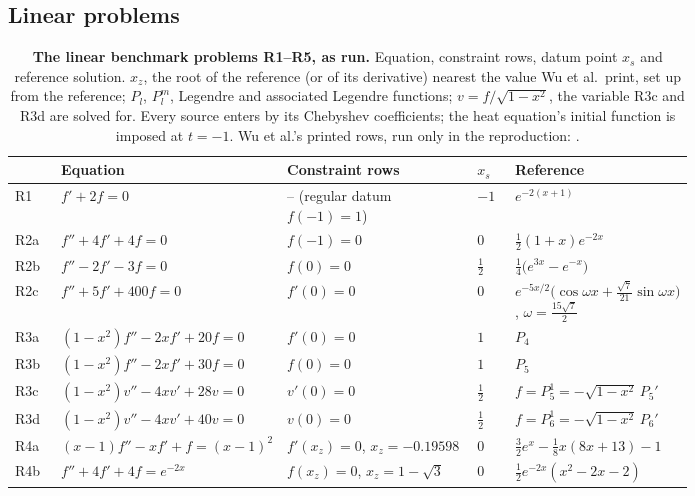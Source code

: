 \subsection{Linear problems}
\label{app:catalogue-linear}

\begin{table}[htbp]
    \centering
    \caption[The linear benchmark problems R1--R5]{\textbf{The linear benchmark problems R1--R5, as run.} Equation, constraint rows, datum point $x_s$ and reference solution. $x_z$, the root of the reference (or of its derivative) nearest the value Wu et al.\ print, set up from the reference; $P_l$, $P_l^m$, Legendre and associated Legendre functions; $v=f/\sqrt{1-x^2}$, the variable R3c and R3d are solved for. Every source enters by its Chebyshev coefficients; the heat equation's initial function is imposed at $t=-1$. Wu et al.'s printed rows, run only in the reproduction: .}
    \label{tab:catalogue-linear}
    \footnotesize
    \begin{tabular}{@{}l p{0.26\linewidth} p{0.29\linewidth} l p{0.24\linewidth}@{}}
        \toprule
        & Equation & Constraint rows & $x_s$ & Reference \\
        \midrule
        R1  & $f' + 2f = 0$ & -- (regular datum $f(-1)=1$) & $-1$ & $e^{-2(x+1)}$ \\
        R2a & $f'' + 4f' + 4f = 0$ & $f(-1) = 0$ & $0$ & $\tfrac12(1+x)e^{-2x}$ \\
        R2b & $f'' - 2f' - 3f = 0$ & $f(0) = 0$ & $\tfrac12$ & $\tfrac14\bigl(e^{3x} - e^{-x}\bigr)$ \\
        R2c & $f'' + 5f' + 400f = 0$ & $f'(0) = 0$ & $0$ & $e^{-5x/2}\bigl(\cos\omega x + \tfrac{\sqrt7}{21}\sin\omega x\bigr)$, $\omega = \tfrac{15\sqrt7}{2}$ \\
        R3a & $(1-x^2)f'' - 2xf' + 20f = 0$ & $f'(0) = 0$ & $1$ & $P_4$ \\
        R3b & $(1-x^2)f'' - 2xf' + 30f = 0$ & $f(0) = 0$ & $1$ & $P_5$ \\
        R3c & $(1-x^2)v'' - 4xv' + 28v = 0$ & $v'(0) = 0$ & $\tfrac12$ & $f = P_5^1 = -\sqrt{1-x^2}\,P_5'$ \\
        R3d & $(1-x^2)v'' - 4xv' + 40v = 0$ & $v(0) = 0$ & $\tfrac12$ & $f = P_6^1 = -\sqrt{1-x^2}\,P_6'$ \\
        R4a & $(x-1)f'' - xf' + f = (x-1)^2$ & $f'(x_z) = 0$, $x_z = -0.19598$ & $0$ & $\tfrac32e^{x} - \tfrac18x(8x+13) - 1$ \\
        R4b & $f'' + 4f' + 4f = e^{-2x}$ & $f(x_z) = 0$, $x_z = 1-\sqrt3$ & $0$ & $\tfrac12e^{-2x}(x^2 - 2x - 2)$ \\

\end{tabular}
\end{table}
